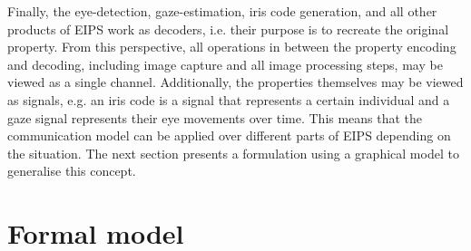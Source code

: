Finally, the eye-detection, gaze-estimation, iris code generation, and all other products of EIPS work as decoders, i.e. their purpose is to recreate the original property. From this perspective, all operations in between the property encoding and decoding, including image capture and all image processing steps, may be viewed as a single channel. Additionally, the properties themselves may be viewed as signals, e.g. an iris code is a signal that represents a certain individual and a gaze signal represents their eye movements over time. This means that the communication model can be applied over different parts of EIPS depending on the situation. The next section presents a formulation using a graphical model to generalise this concept.


\section{Formal model}
